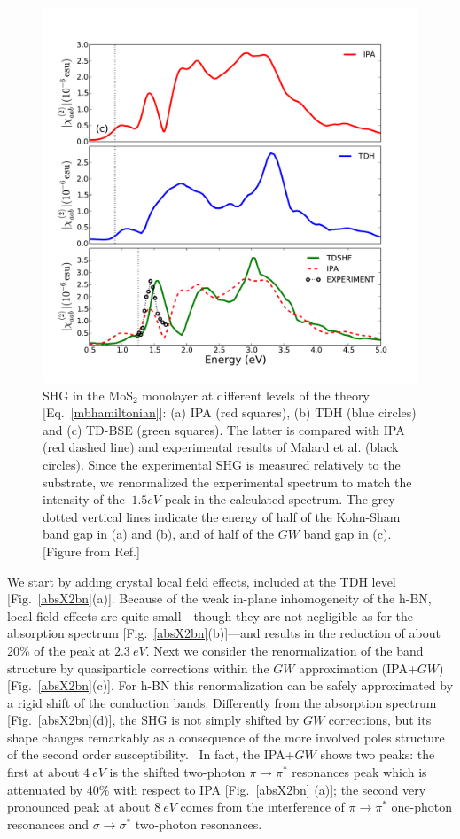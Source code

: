 \begin{figure}[h]
\centering
\includegraphics[width=.7\textwidth]{Figures/absX2MoS2}
\caption{\footnotesize{SHG in the MoS$_2$ monolayer at different levels of the theory [Eq.~\eqref{mbhamiltonian}]: (a) IPA (red squares), (b) TDH (blue circles) and (c) TD-BSE (green squares). The latter is compared with IPA (red dashed line) and experimental results of Malard et al.\cite{PhysRevB.87.201401} (black circles). Since the experimental SHG is measured relatively to the substrate, we renormalized the experimental spectrum to match the intensity of the $~ 1.5 eV$ peak in the calculated spectrum. The grey dotted vertical lines indicate the energy of half of the Kohn-Sham band gap in (a) and (b), and of  half of the $GW$ band gap in (c).[Figure from Ref.\cite{PhysRevB.89.081102}] }\label{fg:SHMoS2}}
\end{figure} 


We start by adding crystal local field effects, included at the TDH level [Fig.~\ref{absX2bn}(a)]. Because of the weak in-plane inhomogeneity of the h-BN, local field effects are quite small---though they are not negligible as for the absorption spectrum  [Fig.~\ref{absX2bn}(b)]---and results in the reduction of about 20\% of the peak at $2.3~eV$. Next we consider the renormalization of the band structure by quasiparticle corrections within the $GW$ approximation (IPA+$GW$) [Fig.~\ref{absX2bn}(c)]. For h-BN this renormalization can be safely approximated by a rigid shift of the conduction bands. Differently from the absorption spectrum [Fig.~\ref{absX2bn}(d)], the SHG is not simply shifted by $GW$ corrections, but its shape changes remarkably as a consequence of the more involved poles structure of the second order susceptibility.~\cite{PhysRevB.82.235201,hughes1996calculation}
In fact, the IPA+$GW$ shows two peaks: the first at about $4~eV$ is the shifted two-photon $\pi \to \pi^*$  resonances peak which is attenuated by 40\% with respect to IPA  [Fig.~\ref{absX2bn} (a)]; the second very pronounced peak at about $8~eV$ comes from the interference of  $\pi \to \pi^*$  one-photon resonances and  $\sigma \to \sigma^*$ two-photon resonances.  

